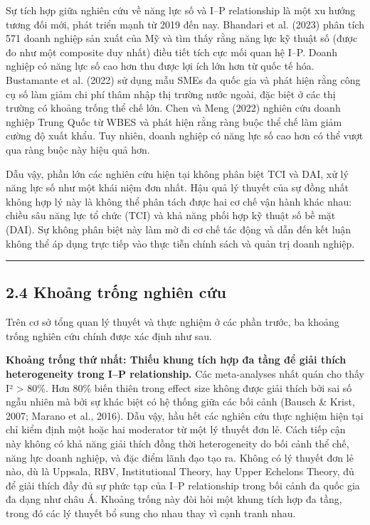 \documentclass[12pt,a4paper]{article}
\begin{document}
Sự tích hợp giữa nghiên cứu về năng lực số và I--P relationship là một
xu hướng tương đối mới, phát triển mạnh từ 2019 đến nay. Bhandari et al.
(2023) phân tích 571 doanh nghiệp sản xuất của Mỹ và tìm thấy rằng năng
lực kỹ thuật số (được đo như một composite duy nhất) điều tiết tích cực
mối quan hệ I--P. Doanh nghiệp có năng lực số cao hơn thu được lợi ích
lớn hơn từ quốc tế hóa. Bustamante et al. (2022) sử dụng mẫu SMEs đa
quốc gia và phát hiện rằng công cụ số làm giảm chi phí thâm nhập thị
trường nước ngoài, đặc biệt ở các thị trường có khoảng trống thể chế
lớn. Chen và Meng (2022) nghiên cứu doanh nghiệp Trung Quốc từ WBES và
phát hiện rằng ràng buộc thể chế làm giảm cường độ xuất khẩu. Tuy nhiên,
doanh nghiệp có năng lực số cao hơn có thể vượt qua ràng buộc này hiệu
quả hơn.

Dẫu vậy, phần lớn các nghiên cứu hiện tại không phân biệt TCI và DAI, xử
lý năng lực số như một khái niệm đơn nhất. Hậu quả lý thuyết của sự đồng
nhất không hợp lý này là không thể phân tách được hai cơ chế vận hành
khác nhau: chiều sâu năng lực tổ chức (TCI) và khả năng phối hợp kỹ
thuật số bề mặt (DAI). Sự không phân biệt này làm mờ đi cơ chế tác động
và dẫn đến kết luận không thể áp dụng trực tiếp vào thực tiễn chính sách
và quản trị doanh nghiệp.

\begin{center}\rule{0.5\linewidth}{0.5pt}\end{center}

\hypertarget{24-khoux1ea3ng-trux1ed1ng-nghiuxean-cux1ee9u}{%
\subsection{2.4 Khoảng trống nghiên
cứu}\label{24-khoux1ea3ng-trux1ed1ng-nghiuxean-cux1ee9u}}

Trên cơ sở tổng quan lý thuyết và thực nghiệm ở các phần trước, ba
khoảng trống nghiên cứu chính được xác định như sau.

\textbf{Khoảng trống thứ nhất: Thiếu khung tích hợp đa tầng để giải
thích heterogeneity trong I--P relationship.} Các meta-analyses nhất
quán cho thấy I² \textgreater{} 80\%. Hơn 80\% biến thiên trong effect
size không được giải thích bởi sai số ngẫu nhiên mà bởi sự khác biệt có
hệ thống giữa các bối cảnh (Bausch \& Krist, 2007; Marano et al., 2016).
Dẫu vậy, hầu hết các nghiên cứu thực nghiệm hiện tại chỉ kiểm định một
hoặc hai moderator từ một lý thuyết đơn lẻ. Cách tiếp cận này không có
khả năng giải thích đồng thời heterogeneity do bối cảnh thể chế, năng
lực doanh nghiệp, và đặc điểm lãnh đạo tạo ra. Không có lý thuyết đơn lẻ
nào, dù là Uppsala, RBV, Institutional Theory, hay Upper Echelons
Theory, đủ để giải thích đầy đủ sự phức tạp của I--P relationship trong
bối cảnh đa quốc gia đa dạng như châu Á. Khoảng trống này đòi hỏi một
khung tích hợp đa tầng, trong đó các lý thuyết bổ sung cho nhau thay vì
cạnh tranh nhau.
\end{document}
